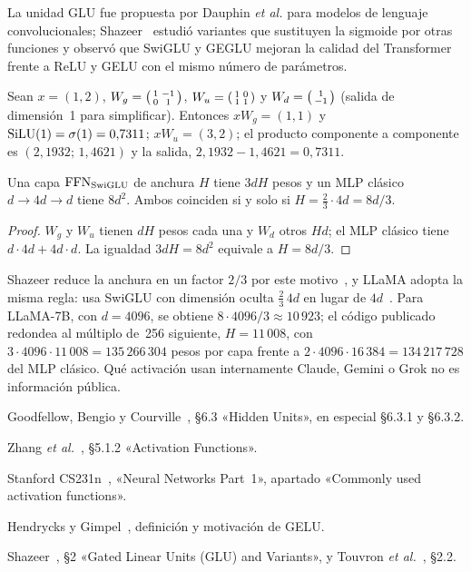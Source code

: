La unidad GLU fue propuesta por Dauphin \emph{et al.} para modelos de lenguaje convolucionales; Shazeer~\cite[§2]{shazeer} estudió variantes que sustituyen la sigmoide por otras funciones y observó que SwiGLU y GEGLU mejoran la calidad del Transformer frente a ReLU y GELU con el mismo número de parámetros.

\begin{ejemplo}\label{ej:swiglu}
Sean $x=(1,2)$, $W_g=\begin{psmallmatrix}1&-1\\0&1\end{psmallmatrix}$, $W_u=\begin{psmallmatrix}1&0\\1&1\end{psmallmatrix}$ y $W_d=\begin{psmallmatrix}1\\-1\end{psmallmatrix}$ (salida de dimensión~1 para simplificar). Entonces $xW_g=(1,1)$ y $\operatorname{SiLU}(1)=\sigma(1)=0{,}7311$; $xW_u=(3,2)$; el producto componente a componente es $(2{,}1932;\,1{,}4621)$ y la salida, $2{,}1932-1{,}4621=0{,}7311$.
\end{ejemplo}

\begin{proposicion}\label{prop:anchura}
Una capa $\operatorname{FFN}_{\mathrm{SwiGLU}}$ de anchura $H$ tiene $3dH$ pesos y un MLP clásico $d\to 4d\to d$ tiene $8d^{2}$. Ambos coinciden si y solo si $H=\tfrac{2}{3}\cdot 4d=8d/3$.
\end{proposicion}

\begin{proof}
$W_g$ y $W_u$ tienen $dH$ pesos cada una y $W_d$ otros $Hd$; el MLP clásico tiene $d\cdot 4d+4d\cdot d$. La igualdad $3dH=8d^{2}$ equivale a $H=8d/3$.
\end{proof}

Shazeer reduce la anchura en un factor $2/3$ por este motivo~\cite[§2]{shazeer}, y LLaMA adopta la misma regla: usa SwiGLU con dimensión oculta $\tfrac23\,4d$ en lugar de $4d$~\cite[§2.2]{touvron}. Para LLaMA-7B, con $d=4096$, se obtiene $8\cdot 4096/3\approx 10\,923$; el código publicado redondea al múltiplo de~256 siguiente, $H=11\,008$, con $3\cdot 4096\cdot 11\,008=135\,266\,304$ pesos por capa frente a $2\cdot 4096\cdot 16\,384=134\,217\,728$ del MLP clásico. Qué activación usan internamente Claude, Gemini o Grok no es información pública.

\begin{lecturas}
\item Goodfellow, Bengio y Courville~\cite{gbc}, §6.3 «Hidden Units», en especial §6.3.1 y §6.3.2.
\item Zhang \emph{et al.}~\cite{d2l}, §5.1.2 «Activation Functions».
\item Stanford CS231n~\cite{cs231n}, «Neural Networks Part~1», apartado «Commonly used activation functions».
\item Hendrycks y Gimpel~\cite{hendrycks}, definición y motivación de GELU.
\item Shazeer~\cite{shazeer}, §2 «Gated Linear Units (GLU) and Variants», y Touvron \emph{et al.}~\cite{touvron}, §2.2.
\end{lecturas}

